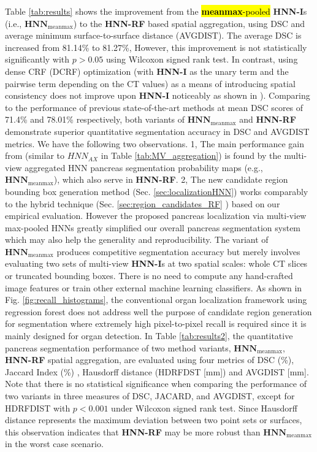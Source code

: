 \documentclass[journal]{IEEEtran}
\begin{document}
Table \ref{tab:results} shows the improvement from the \hl{\textbf{meanmax}-pooled} \textbf{HNN-I}s (i.e., $\mathbf{HNN}_\mathrm{meanmax}$) to the \textbf{HNN-RF} based spatial aggregation, using DSC and average minimum surface-to-surface distance (AVGDIST). The average DSC is increased from 81.14\% to 81.27\%, However, this improvement is not statistically significantly with $p>0.05$ using Wilcoxon signed rank test. In contrast, using dense CRF (DCRF) optimization \cite{chen2014semantic} (with \textbf{HNN-I} as the unary term and the pairwise term depending on the CT values) as a means of introducing spatial consistency does not improve upon \textbf{HNN-I} noticeably as shown in \cite{roth2016spatial}). Comparing to the performance of previous state-of-the-art methods \cite{roth2015deeporgan, roth2016spatial} at mean DSC scores of 71.4\% and 78.01\% respectively, both variants of $\mathbf{HNN}_\mathrm{meanmax}$ and \textbf{HNN-RF} demonstrate superior quantitative segmentation accuracy in DSC and AVGDIST metrics. We have the following two observations. 1, The main performance gain from \cite{roth2016spatial} (similar to $HNN_{AX}$ in Table \ref{tab:MV_aggregation}) is found by the multi-view aggregated HNN pancreas segmentation probability maps (e.g., $\mathbf{HNN}_\mathrm{meanmax}$), which also serve in \textbf{HNN-RF}. 2, The new candidate region bounding box generation method (Sec. \ref{sec:localizationHNN}) works comparably to the hybrid technique (Sec. \ref{sec:region_candidates_RF} \cite{farag2014bottom,roth2015deeporgan,roth2016spatial}) based on our empirical evaluation. However the proposed pancreas localization via multi-view max-pooled HNNs greatly simplified our overall pancreas segmentation system which may also help the generality and reproducibility. The variant of $\mathbf{HNN}_\mathrm{meanmax}$ produces competitive segmentation accuracy but merely involves evaluating two sets of multi-view \textbf{HNN-I}s at two spatial scales: whole CT slices or truncated bounding boxes. There is no need to compute any hand-crafted image features \cite{farag2014bottom} or train other external machine learning classifiers. As shown in Fig. \ref{fig:recall_histograms}, the conventional organ localization framework using regression forest \cite{criminisi2013regression,laybirkbeck2013} does not address well the purpose of candidate region generation for segmentation where extremely high pixel-to-pixel recall is required since it is mainly designed for organ detection.
In Table \ref{tab:results2}, the quantitative pancreas segmentation performance of two method variants, $\mathbf{HNN}_\mathrm{meanmax}$, \textbf{HNN-RF} spatial aggregation, are evaluated using four metrics of DSC (\%), Jaccard Index (\%) \cite{Levandowsky1971}, Hausdorff distance (HDRFDST [mm]) \cite{Rockafellar2005} and AVGDIST [mm]. Note that there is no statistical significance when comparing the performance of two variants in three measures of DSC, JACARD, and AVGDIST, except for HDRFDIST with $p<0.001$ under Wilcoxon signed rank test. Since Hausdorff distance represents the maximum deviation between two point sets or surfaces, this observation indicates that \textbf{HNN-RF} may be more robust than $\mathbf{HNN}_\mathrm{meanmax}$ in the worst case scenario.
\end{document}
